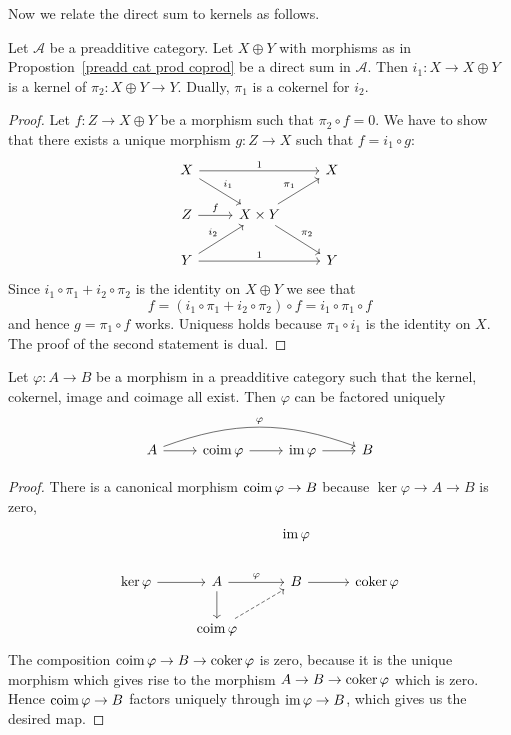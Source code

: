 Now we relate the direct sum to kernels as follows.
\begin{proposition}
Let $\mathcal{A}$ be a preadditive category. Let $X\oplus Y$ with morphisms as in Propostion~\ref{preadd cat prod coprod} be a direct sum in $\mathcal{A}$. Then $i_1:X\to X\oplus Y$ is a kernel of $\pi_2:X\oplus Y\to Y$. Dually, $\pi_1$ is a cokernel for $i_2$.
\end{proposition}
\begin{proof}
Let $f:Z\to X\oplus Y$ be a morphism such that $\pi_2\circ f=0$. We have to show that there exists a unique morphism $g:Z\to X$ such that $f=i_1\circ g$:
\[\begin{tikzcd}
X\ar[rr,"1"]\ar[rd,"i_1"]&&X\\
Z\ar[r,"f"]&X\times Y\ar[ru,"\pi_1"]\ar[rd,"\pi_2"]&\\
Y\ar[rr,"1"]\ar[ru,"i_2"]&&Y
\end{tikzcd}\] Since $i_1\circ\pi_1+i_2\circ\pi_2$ is the identity on $X\oplus Y$ we see that
\[f=(i_1\circ\pi_1+i_2\circ\pi_2)\circ f=i_1\circ\pi_1\circ f\]
and hence $g=\pi_1\circ f$ works. Uniquess holds because $\pi_1\circ i_1$ is the identity on $X$. The proof of the second statement is dual.
\end{proof}
\begin{theorem}\label{preadditive coim im}
Let $\varphi:A\to B$ be a morphism in a preadditive category such that
the kernel, cokernel, image and coimage all exist. Then $\varphi$ can be factored uniquely
\[\begin{tikzcd}
A\ar[rrr,bend left=20pt,"\varphi"]\ar[r]&\coim\varphi\ar[r]&\im\varphi\ar[r]&B
\end{tikzcd}\]
\end{theorem}
\begin{proof}
There is a canonical morphism $\operatorname{coim}\varphi\to B$ because $\ker\varphi\to A\to B$ is zero,
\[\begin{tikzcd}
&&\im\varphi&\\
\ker\varphi\ar[r]&A\ar[r,"\varphi"]\ar[d]&B\ar[r]&\coker\varphi\\
&\coim\varphi\ar[ru,dashed]
\end{tikzcd}\]
The composition $\operatorname{coim}\varphi\to B\to\operatorname{coker}\varphi$ is zero, because it is the unique morphism which gives rise to the morphism $A\to B\to\operatorname{coker}\varphi$ which is zero. Hence $\operatorname{coim}\varphi\to B$ factors uniquely through $\operatorname{im}\varphi\to B$, which gives us the desired map.
\end{proof}
